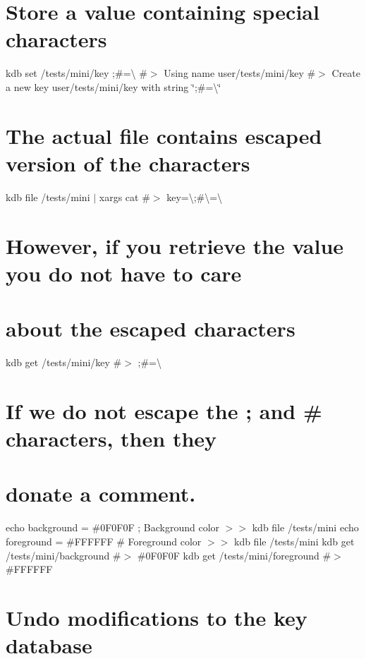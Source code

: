 \section*{Store a value containing special characters}

kdb set /tests/mini/key \textquotesingle{};\#=\textbackslash{}\textquotesingle{} \#$>$ Using name user/tests/mini/key \#$>$ Create a new key user/tests/mini/key with string \char`\"{};\#=\textbackslash{}\char`\"{}

\section*{The actual file contains escaped version of the characters}

kdb file /tests/mini $\vert$ xargs cat \#$>$ key=\textbackslash{};\#\textbackslash{}=\textbackslash{}

\section*{However, if you retrieve the value you do not have to care}

\section*{about the escaped characters}

kdb get /tests/mini/key \#$>$ ;\#=\textbackslash{}

\section*{If we do not escape the {\ttfamily ;} and {\ttfamily \#} characters, then they}

\section*{donate a comment.}

echo \textquotesingle{}background = \#0\+F0\+F0F ; Background color\textquotesingle{} $>$$>$ {\ttfamily kdb file /tests/mini} echo \textquotesingle{}foreground = \#F\+F\+F\+F\+FF \# Foreground color\textquotesingle{} $>$$>$ {\ttfamily kdb file /tests/mini} kdb get /tests/mini/background \#$>$ \#0\+F0\+F0F kdb get /tests/mini/foreground \#$>$ \#\+F\+F\+F\+F\+FF

\section*{Undo modifications to the key database}

